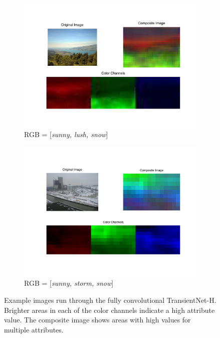 \documentclass[10pt,twocolumn,letterpaper]{article}
\begin{document}
\begin{figure}
  \centering
  \begin{subfigure}[b]{0.49\textwidth}
    \centering
		\includegraphics[width=\textwidth]{figs/false_color_7371.pdf}
    \caption{RGB = [\textit{sunny, lush, snow}]}
    \label{fig:false_color_1}
  \end{subfigure}
  \begin{subfigure}[b]{0.49\textwidth}
    \centering
		\includegraphics[width=\textwidth]{figs/false_color_82.pdf}
    \caption{RGB = [\textit{sunny, storm, snow}]}
    \label{fig:false_color_2}
  \end{subfigure}
  \caption{Example images run through the fully convolutional TransientNet-H.
           Brighter areas in each of the color channels indicate a high
           attribute value.  The composite image shows areas with high values
           for multiple attributes.}
  \label{fig:false_color_ims}
\end{figure}
\end{document}
